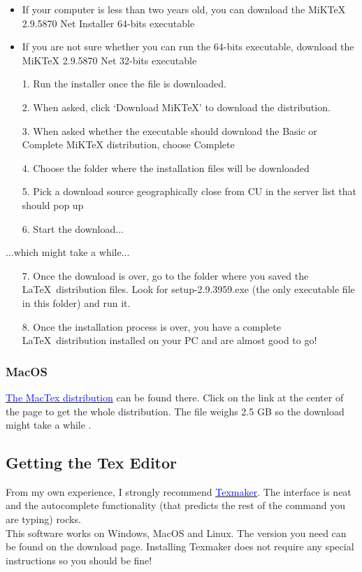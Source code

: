 \documentclass{report}
\begin{document}
\begin{itemize}
\item If your computer is less than two years old,
you can download the MiKTeX 2.9.5870 Net Installer 64-bits executable
\item If you are not sure whether you can run the 64-bits executable, 
download the MiKTeX 2.9.5870 Net 32-bits executable 
\end{itemize}


\begin{itemize}
\item[1.] Run the installer once the file is downloaded.
\item[2.] When asked, click ‘Download MiKTeX’ to download the distribution.
\item[3.] When asked whether the executable should download the Basic or Complete MiKTeX distribution, choose Complete
\item[4.] Choose the folder where the installation files will be downloaded
\item[5.] Pick a download source geographically close from CU in the server list that should pop up
\item[6.] Start the download...
\end{itemize}
...which might take a while...
\begin{itemize}
\item[7.] Once the download is over, go to the folder where you saved the \LaTeX\ distribution files. Look for setup-2.9.3959.exe (the only executable file in this folder) and run it.
\item[8.] Once the installation process is over, you have a complete \LaTeX\ distribution installed on your PC and are almost good to go!
\end{itemize}

\subsubsection{MacOS}
\href{https://tug.org/mactex/mactex-download.html}{\textcolor{blue}{The MacTex distribution}} can be found there. Click on the link at the center of the page to get the whole distribution. The file weighs 2.5 GB so the download might take a while .

\subsection{Getting the Tex Editor}
From my own experience, I strongly recommend
\href{http://www.xm1math.net/texmaker/}{\textcolor{blue}{Texmaker}}. The interface is neat and the autocomplete functionality (that predicts the rest of the command you are typing) rocks.\\
This software works on Windows, MacOS and Linux. The version you need can be found on the download page. Installing Texmaker does not require any special instructions so you should be fine!
\end{document}
